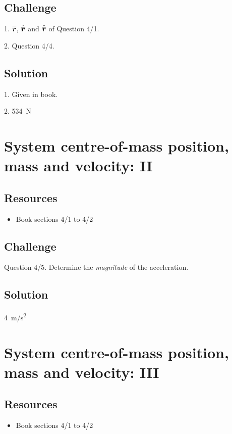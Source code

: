 \subsection*{Challenge}
1. $\bm{\overline{r}}$, $\dot{\bm{\overline{r}}}$ and $\ddot{\bm{\overline{r}}}$ of Question 4/1.

2. Question 4/4.

\subsection*{Solution}
1. Given in book.

2. \SI{534}{N}




\newpage
\section{System centre-of-mass position, mass and velocity: II}

\subsection*{Resources}
\begin{itemize}
    \item Book sections 4/1 to 4/2
\end{itemize}

\subsection*{Challenge}
Question 4/5. Determine the \emph{magnitude} of the acceleration.

\subsection*{Solution}
\SI{4}{m/s^2}




\newpage
\section{System centre-of-mass position, mass and velocity: III}

\subsection*{Resources}
\begin{itemize}
    \item Book sections 4/1 to 4/2
\end{itemize}

